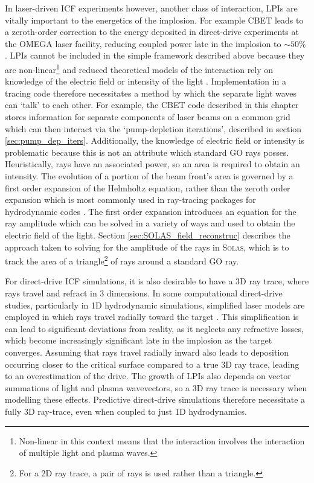 In laser-driven \ac{ICF} experiments however, another class of interaction, \ac{LPIs} are vitally important to the energetics of the implosion.
For example \ac{CBET} leads to a zeroth-order correction to the energy deposited in direct-drive experiments at the OMEGA laser facility, reducing coupled power late in the implosion to $\sim 50\%$ \cite{colaitis_inverse_2021}.
\ac{LPIs} cannot be included in the simple framework described above because they are non-linear\footnote{Non-linear in this context means that the interaction involves the interaction of multiple light and plasma waves.} and reduced theoretical models of the interaction rely on knowledge of the electric field or intensity of the light \cite{randall_theory_1981}.
Implementation in a tracing code therefore necessitates a method by which the separate light waves can `talk' to each other.
For example, the \ac{CBET} code described in this chapter stores information for separate components of laser beams on a common grid which can then interact via the `pump-depletion iterations', described in section \ref{sec:pump_dep_iters}.
Additionally, the knowledge of electric field or intensity is problematic because this is not an attribute which standard \ac{GO} rays posses.
Heuristically, rays have an associated power, so an area is required to obtain an intensity.
The evolution of a portion of the beam front's area is governed by a first order expansion of the Helmholtz equation, rather than the zeroth order expansion which is most commonly used in ray-tracing packages for hydrodynamic codes \cite{colaitis_towards_2014}.
The first order expansion introduces an equation for the ray amplitude which can be solved in a variety of ways and used to obtain the electric field of the light.
Section \ref{sec:SOLAS_field_reconstruc} describes the approach taken to solving for the amplitude of the rays in \textsc{Solas}, which is to track the area of a triangle\footnote{For a 2D ray trace, a pair of rays is used rather than a triangle.} of rays around a standard \ac{GO} ray.

For direct-drive \ac{ICF} simulations, it is also desirable to have a 3D ray trace, where rays travel and refract in 3 dimensions.
In some computational direct-drive studies, particularly in 1D hydrodynamic simulations, simplified laser models are employed in which rays travel radially toward the target \cite{paddock_one-dimensional_2021}.
This simplification is can lead to significant deviations from reality, as it neglects any refractive losses, which become increasingly significant late in the implosion as the target converges.
Assuming that rays travel radially inward also leads to deposition occurring closer to the critical surface compared to a true 3D ray trace, leading to an overestimation of the drive.
The growth of \ac{LPIs} also depends on vector summations of light and plasma wavevectors, so a 3D ray trace is necessary when modelling these effects.
Predictive direct-drive simulations therefore necessitate a fully 3D ray-trace, even when coupled to just 1D hydrodynamics.


